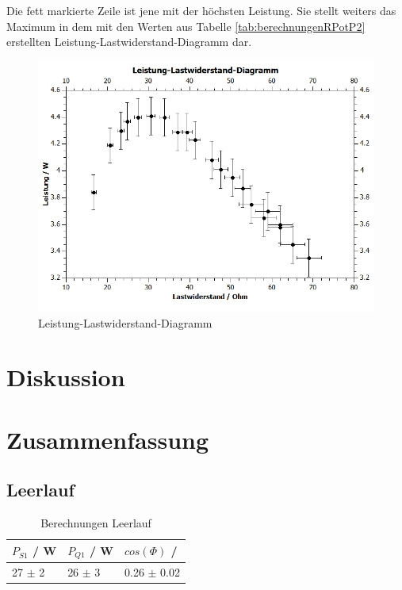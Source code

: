\documentclass[12pt,a4paper,twoside]{article}
\begin{document}
\noindent
Die fett markierte Zeile ist jene mit der höchsten Leistung. Sie stellt weiters das Maximum in dem mit den Werten aus Tabelle \ref{tab:berechnungenRPotP2} erstellten Leistung-Lastwiderstand-Diagramm dar.

\begin{figure}[H]
    \centering
    \includegraphics[width=0.6\linewidth, angle=0]{nudes/Leistung-Lastwiderstand-Diagramm.jpg}
    \caption{Leistung-Lastwiderstand-Diagramm}
    \label{fig:LeistungLastwiderstandDiagramm}
\end{figure}



\section{Diskussion} %




\section{Zusammenfassung} %

\subsection{Leerlauf}

\begin{table}[H]
    \centering
    \caption{Berechnungen Leerlauf}
    \label{tab:BerechnungenLeerlaufAW}
    \begin{tabular}{| l | l | l |}
        \hline
        $P_{S1}$ / W & $P_{Q1}$ / W & $cos(\Phi)$ / \\
        \hline
        27 $\pm$ 2 & 26 $\pm$ 3 & 0.26 $\pm$ 0.02 \\
        \hline
    \end{tabular}
\end{table}
\end{document}
